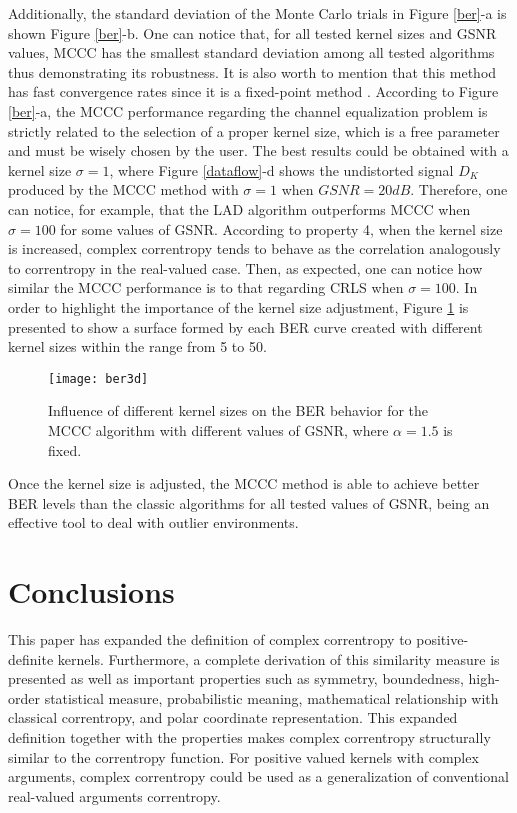 \documentclass[preprint,12pt]{elsarticle}
\begin{document}
Additionally, the standard deviation of the Monte Carlo trials in Figure \ref{ber}-a is shown Figure \ref{ber}-b. One can notice that, for all tested kernel sizes and GSNR values, MCCC has the smallest standard deviation among all tested algorithms thus demonstrating its robustness. It is also worth to mention that this method has fast convergence rates since it is a fixed-point method \citep{7763864}. According to Figure \ref{ber}-a, the MCCC performance regarding the channel equalization problem is strictly related to the selection of a proper kernel size, which is a free parameter and must be wisely chosen by the user. The best results could be obtained with a kernel size $\sigma=1$, where Figure \ref{dataflow}-d shows the undistorted signal $D_K$ produced by the MCCC method with $\sigma=1$ when $GSNR=20 dB$. Therefore, one can notice, for example, that the LAD algorithm outperforms MCCC when $\sigma=100$ for some values of GSNR. According to property 4, when the kernel size is increased, complex correntropy tends to behave as the correlation analogously to correntropy in the real-valued case. Then, as expected, one can notice how similar the MCCC performance is to that regarding CRLS when $\sigma=100$. In order to highlight the importance of the kernel size adjustment, Figure \ref{ber3d} is presented to show a surface formed by each BER curve created with different kernel sizes within the range from 5 to 50.


\begin{figure}[H]
	\centering
	\texttt{[image: ber3d]}
	\caption{Influence of different kernel sizes on the BER behavior for the MCCC algorithm with different values of GSNR, where $\alpha = 1.5 $ is fixed. } 
	\label{ber3d}
\end{figure}


Once the kernel size is adjusted, the MCCC method is able to achieve better BER levels than the classic algorithms for all tested values of GSNR, being an effective tool to deal with outlier environments.




\section{Conclusions}\label{conc}



This paper has expanded the definition of complex correntropy to positive-definite kernels. Furthermore, a complete derivation of this similarity measure is presented as well as important properties such as symmetry, boundedness, high-order statistical measure, probabilistic meaning, mathematical relationship with classical correntropy, and polar coordinate representation. This expanded definition together with the properties makes complex correntropy structurally similar to the correntropy function. For positive valued kernels with complex arguments, complex correntropy could be used as a generalization of conventional real-valued arguments correntropy.
\end{document}
